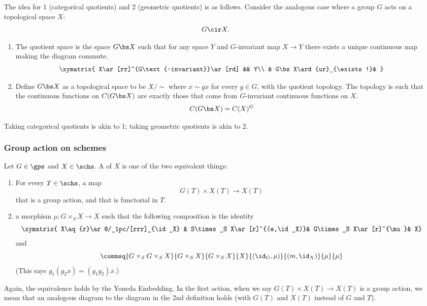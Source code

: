 The idea for 1 (categorical quotients) and 2 (geometric quotients) is as follows. Consider the analogous case where a group $G$ acts on a topological space $X$:
\[
G\cir X.
\]
\begin{enumerate}
\item
The quotient space is the space $G\bs X$ such that for any space $Y$ and $G$-invariant map $X\to Y$ there exists a unique continuous map making the diagram commute.
\[
\xymatrix{
X\ar[rr]^{G\text{-invariant}}\ar[rd] && Y\\
& G\bs X\ard{ur}_{\exists!}&
}
\]
\item
Define $G\bs X$ as a topological space to be $X/\sim$ where $x\sim gx$ for every $g\in G$, with the quotient topology. 
The topology is such that the continuous functions on $C(G\bs X)$ are exactly those that come from $G$-invariant continuous functions on $X$.
\[
C(G\bs X)=C(X)^G
\]
\end{enumerate}
Taking categorical quotients is akin to 1; taking geometric quotients is akin to 2.
\subsubsection{Group action on schemes}
\begin{df}
Let $G\in \gps$ and $X\in \schs$. A  of $X$ is one of the two equivalent things:
\begin{enumerate}
\item
For every $T\in \schs$, a map
\[
G(T)\times X(T)\to X(T)
\]
that is a group action, and that is functorial in $T$.
\item
a morphism $\mu:G\times_SX\to X$ such that  the following composition is the identity
\[
\xymatrix{
X\aq{r}\ar@/_1pc/[rrr]_{\id_X} &  S\times_S X\ar[r]^{(e,\id_X)}& G\times_S X\ar[r]^{\mu}& X}
\]
and
\[
\commsq{G\times_S G\times_S X}{G\times_S X}{G\times_SX}{X}{(\id_G,\mu)}{(m,\id_X)}{\mu}{\mu}
\]
(This says $g_1(g_2x)=(g_1g_2)x$.)
\end{enumerate}
\end{df}
Again, the equivalence holds by the Yoneda Embedding. In the first action, when we say $G(T)\times X(T)\to X(T)$ is a group action, we mean that an analogous diagram to the diagram in the 2nd definition holds (with $G(T)$ and $X(T)$ instead of $G$ and $T$).

